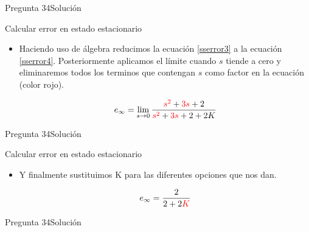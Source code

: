 \documentclass[10pt]{beamer}
\begin{document}
{\begin{frame}{Pregunta 34}{Solución}
\begin{block}{Calcular error en estado estacionario}
\begin{itemize}
    \begin{equation}\label{sserror3}
        e_{\infty} = \lim\limits_{s \to 0}s\frac{\left(\frac{\textcolor{red}{1}}{\textcolor{red}{s}}\right)}{1+\left(\frac{2K}{s^2 + 3s + 2}\right)}
    \end{equation}
    
    \medskip
    
    \item<2-> Haciendo uso de álgebra reducimos la ecuación \ref{sserror3} a la ecuación \ref{sserror4}. Posteriormente aplicamos el límite cuando $s$ tiende a cero y eliminaremos todos los terminos que contengan $s$ como factor en la ecuación (color rojo).
    
    \begin{equation}\label{sserror4}
        e_{\infty} = \lim\limits_{s \to 0} \frac{\textcolor{red}{s^2} + \textcolor{red}{3s} + 2}{\textcolor{red}{s^2} + \textcolor{red}{3s} + 2 + 2K}
        
    \end{equation}
  \end{itemize}

\end{block}
\end{frame}

\begin{frame}{Pregunta 34}{Solución}
  
\begin{block}{Calcular error en estado estacionario}
  
  \begin{itemize}
    \item<1-> Y finalmente sustituimos K para las diferentes opciones que nos dan.
    
    \begin{equation}\label{sserror5}
        e_{\infty} = \frac{2}{2+2\textcolor{red}{K}}
    \end{equation}
    
  \end{itemize}

\end{block}
\end{frame}

\begin{frame}{Pregunta 34}{Solución}
  

\end{frame}}
\end{document}
